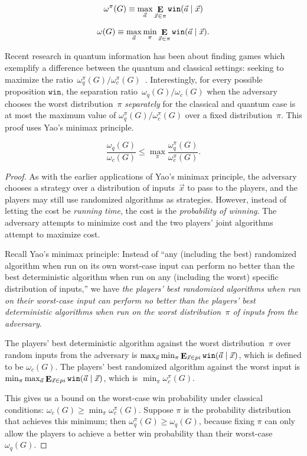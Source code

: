 $$\omega^\pi(G) \equiv \max_{\vec{a}} \mathop{\mathbf{E}}_{\vec{x} \in \pi} \texttt{win}(\vec{a}\nobreak\mid\nobreak\vec{x})$$

$$\omega(G) \equiv \max_{\vec{a}} \min_\pi \mathop{\mathbf{E}}_{\vec{x} \in \pi} \texttt{win}(\vec{a}\nobreak\mid\nobreak\vec{x}).$$

Recent research in quantum information has been about finding games which exemplify a difference between the quantum and classical settings: seeking to maximize the ratio~$\omega_q^\pi(G) / \omega_c^\pi(G)$~\cite{ABBSSV}. Interestingly, for every possible proposition $\texttt{win}$, the separation ratio~$\omega_q(G) / \omega_c(G)$ when the adversary chooses the worst distribution~$\pi$ \emph{separately} for the classical and quantum case is at most the maximum value of $\omega_q^\pi(G) / \omega_c^\pi(G)$ over a fixed distribution~$\pi$. This proof uses Yao's minimax principle.

\begin{theorem}
	$$\frac{\omega_q(G)}{\omega_c(G)} \leq \max_\pi \frac{\omega_q^\pi(G)}{\omega_c^\pi(G)}.$$
\end{theorem}

\begin{proof}

As with the earlier applications of Yao's minimax principle, the adversary chooses a strategy over a distribution of inputs~$\vec{x}$ to pass to the players, and the players may still use randomized algorithms as strategies. However, instead of letting the cost be \emph{running time}, the cost is the \emph{probability of winning}. The adversary attempts to minimize cost and the two players' joint algorithms attempt to maximize cost. 

Recall Yao's minimax principle: Instead of ``any (including the best) randomized algorithm when run on its own worst-case input can perform no better than the best deterministic algorithm when run on any (including the worst) specific distribution of inputs,'' we have \emph{the players' best randomized algorithms when run on their worst-case input can perform no better than the players' best deterministic algorithms when run on the worst distribution~$\pi$ of inputs from the adversary}. 

The players' best deterministic algorithm against the worst distribution~$\pi$ over random inputs from the adversary is $\max_{\vec{a}} \min_{\pi} \mathop{\mathbf{E}}_{\vec{x} \in pi} \texttt{win}(\vec{a}\nobreak\mid\nobreak\vec{x})$, which is defined to be $\omega_c(G)$. The players' best randomized algorithm against the worst input is $\min_\pi \max_{\vec{a}} \mathop{\mathbf{E}}_{\vec{x} \in pi} \texttt{win}(\vec{a}\nobreak\mid\nobreak\vec{x})$, which is $\displaystyle\min_\pi \omega^\pi_c(G)$.

This gives us a bound on the worst-case win probability under classical conditions: $\omega_c(G) \geq \min_{\pi} \omega_c^\pi(G)$. Suppose $\pi$ is the probability distribution that achieves this minimum; then $\omega_q^\pi(G) \geq \omega_q(G)$, because fixing $\pi$ can only allow the players to achieve a better win probability than their worst-case $\omega_q(G)$.
\end{proof}

